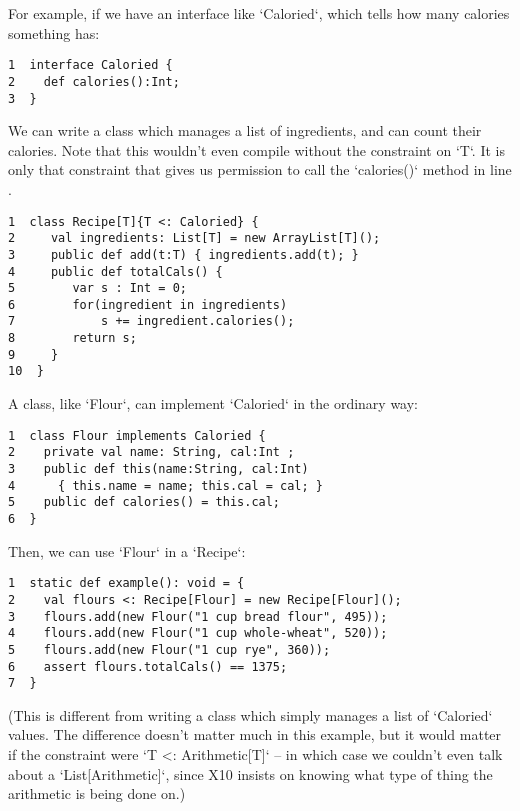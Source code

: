 For example, if we have an interface like \xcd`Caloried`, which tells how many
calories something has: 
\begin{verbatim}
1  interface Caloried {
2    def calories():Int;
3  }
\end{verbatim}

We can write a class which manages a list of ingredients, and can count their
calories.  Note that this wouldn't even compile without the constraint 
on \xcd`T`.  It is only that constraint that gives us permission to 
call the \xcd`calories()` method in line
.  
\begin{verbatim}
1  class Recipe[T]{T <: Caloried} {
2     val ingredients: List[T] = new ArrayList[T]();
3     public def add(t:T) { ingredients.add(t); }
4     public def totalCals() {
5        var s : Int = 0;
6        for(ingredient in ingredients) 
7            s += ingredient.calories(); 
8        return s;
9     }
10  }
\end{verbatim}

A class, like \xcd`Flour`, can implement \xcd`Caloried` in the ordinary way: 
\begin{verbatim}
1  class Flour implements Caloried {
2    private val name: String, cal:Int ;
3    public def this(name:String, cal:Int) 
4      { this.name = name; this.cal = cal; }
5    public def calories() = this.cal;
6  }
\end{verbatim}

Then, we can use \xcd`Flour` in a \xcd`Recipe`: 

\begin{verbatim}
1  static def example(): void = {
2    val flours <: Recipe[Flour] = new Recipe[Flour]();
3    flours.add(new Flour("1 cup bread flour", 495));
4    flours.add(new Flour("1 cup whole-wheat", 520));
5    flours.add(new Flour("1 cup rye", 360));
6    assert flours.totalCals() == 1375;
7  }
\end{verbatim}



(This is different from writing a class which simply manages a list of
\xcd`Caloried` values.  The difference doesn't matter much in this example,
but it would matter if the constraint were \xcd`T <: Arithmetic[T]` -- in
which case we couldn't even talk about a \xcd`List[Arithmetic]`, since X10
insists on knowing what type of thing the arithmetic is being done on.)


